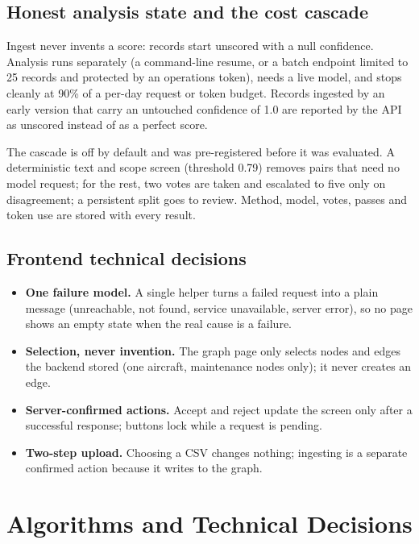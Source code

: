 \subsection{Honest analysis state and the cost cascade}

Ingest never invents a score: records start unscored with a null confidence. Analysis runs separately (a command-line resume, or a batch endpoint limited to 25 records and protected by an operations token), needs a live model, and stops cleanly at 90\% of a per-day request or token budget. Records ingested by an early version that carry an untouched confidence of 1.0 are reported by the API as unscored instead of as a perfect score.

The cascade is off by default and was pre-registered before it was evaluated. A deterministic text and scope screen (threshold 0.79) removes pairs that need no model request; for the rest, two votes are taken and escalated to five only on disagreement; a persistent split goes to review. Method, model, votes, passes and token use are stored with every result.

\subsection{Frontend technical decisions}

\begin{itemize}
\item \textbf{One failure model.} A single helper turns a failed request into a plain message (unreachable, not found, service unavailable, server error), so no page shows an empty state when the real cause is a failure.
\item \textbf{Selection, never invention.} The graph page only selects nodes and edges the backend stored (one aircraft, maintenance nodes only); it never creates an edge.
\item \textbf{Server-confirmed actions.} Accept and reject update the screen only after a successful response; buttons lock while a request is pending.
\item \textbf{Two-step upload.} Choosing a CSV changes nothing; ingesting is a separate confirmed action because it writes to the graph.
\end{itemize}

\section{Algorithms and Technical Decisions}

